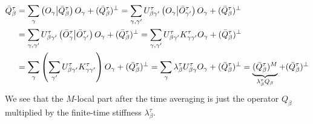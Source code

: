 \begin{align}
  \bar{Q}^{\tau}_{\beta} & =  \sum_{\gamma} \left(O_{\gamma} \middle| \bar{Q} ^{\tau}_{\beta}\right)O_{\gamma} + (\bar{Q} ^{\tau}_{\beta})^{\perp} = \sum_{\gamma,\gamma^{\prime}} U^{\tau}_{\beta \gamma^{\prime}}\left(O_{\gamma} \middle| \bar{O}_{\gamma^{\prime}}^{\tau}\right)
  O_{\gamma}+(\bar{Q} ^{\tau}_{\beta})^{\perp} \nonumber                                                                                                                                                                                             \\
                         & = \sum_{\gamma,\gamma^{\prime}} U^{\tau}_{\beta\gamma^{\prime}}\left(\bar{O}_{\gamma}^{\tau} \middle| \bar{O}_{\gamma^{\prime}}^{\tau}\right) O_{\gamma}+(\bar{Q} ^{\tau}_{\beta})^{\perp}
  = \sum_{\gamma,\gamma^{\prime}} U^{\tau}_{\beta\gamma^{\prime}}K^{\tau}_{\gamma\gamma^{\prime}} O_{\gamma}+(\bar{Q} ^{\tau}_{\beta})^{\perp} \nonumber                                                                                             \\
                         & = \sum_{\gamma}  \left( \sum_{\gamma^{\prime}} U^{\tau}_{\beta\gamma^{\prime}}K_{\gamma\gamma^{\prime}}^{\tau}\right) O_{\gamma}+(\bar{Q} ^{\tau}_{\beta})^{\perp} = \sum_{\gamma}
  \lambda^{\tau}_{\beta} U^{\tau}_{\beta \gamma} O_{\gamma}+(\bar{Q} ^{\tau}_{\beta})^{\perp} = \underbrace{(\bar{Q}^{\tau}_{\beta})^{M}}_{\lambda_{\beta }^{\tau } Q_{\beta }}+(\bar{Q} ^{\tau}_{\beta})^{\perp}
  \label{eq:decomposition2}
\end{align}
We see that the \(M\)-local part after the time averaging is just the operator \(Q_{\beta}\) multiplied by the finite-time stiffness \(\lambda_{\beta}^{\tau}\).


